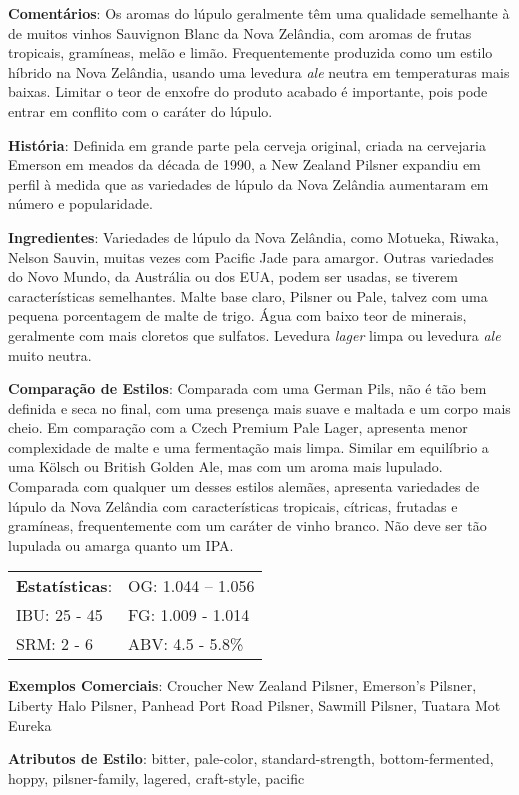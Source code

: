 \textbf{Comentários}: Os aromas do lúpulo geralmente têm uma qualidade semelhante à de muitos vinhos Sauvignon Blanc da Nova Zelândia, com aromas de frutas tropicais, gramíneas, melão e limão. Frequentemente produzida como um estilo híbrido na Nova Zelândia, usando uma levedura \textit{ale} neutra em temperaturas mais baixas. Limitar o teor de enxofre do produto acabado é importante, pois pode entrar em conflito com o caráter do lúpulo.

\textbf{História}: Definida em grande parte pela cerveja original, criada na cervejaria Emerson em meados da década de 1990, a New Zealand Pilsner expandiu em perfil à medida que as variedades de lúpulo da Nova Zelândia aumentaram em número e popularidade.

\textbf{Ingredientes}: Variedades de lúpulo da Nova Zelândia, como Motueka, Riwaka, Nelson Sauvin, muitas vezes com Pacific Jade para amargor. Outras variedades do Novo Mundo, da Austrália ou dos EUA, podem ser usadas, se tiverem características semelhantes. Malte base claro, Pilsner ou Pale, talvez com uma pequena porcentagem de malte de trigo. Água com baixo teor de minerais, geralmente com mais cloretos que sulfatos. Levedura \textit{lager} limpa ou levedura \textit{ale} muito neutra.

\textbf{Comparação de Estilos}: Comparada com uma German Pils, não é tão bem definida e seca no final, com uma presença mais suave e maltada e um corpo mais cheio. Em comparação com a Czech Premium Pale Lager, apresenta menor complexidade de malte e uma fermentação mais limpa. Similar em equilíbrio a uma Kölsch ou British Golden Ale, mas com um aroma mais lupulado. Comparada com qualquer um desses estilos alemães, apresenta variedades de lúpulo da Nova Zelândia com características tropicais, cítricas, frutadas e gramíneas, frequentemente com um caráter de vinho branco. Não deve ser tão lupulada ou amarga quanto um IPA.

\begin{tabular}{@{}p{35mm}p{35mm}@{}}
  \textbf{Estatísticas}: & OG: 1.044 – 1.056\\
  IBU: 25 - 45 & FG: 1.009 - 1.014 \\
  SRM: 2 - 6  & ABV: 4.5 - 5.8\%
\end{tabular}

\textbf{Exemplos Comerciais}: Croucher New Zealand Pilsner, Emerson’s Pilsner, Liberty Halo Pilsner, Panhead Port Road Pilsner, Sawmill Pilsner, Tuatara Mot Eureka

\textbf{Atributos de Estilo}: bitter, pale-color, standard-strength, bottom-fermented, hoppy, pilsner-family, lagered, craft-style, pacific